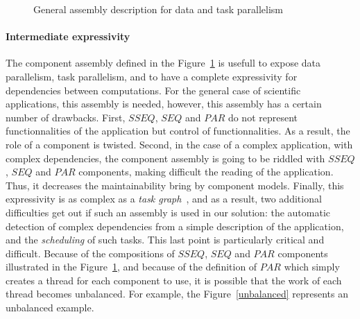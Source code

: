 \begin{figure}[h!]
\begin{center}
\caption{General assembly description for data and task parallelism}
\label{allparall}
\end{center}
\end{figure}

\paragraph{Intermediate expressivity}
The component assembly defined in the Figure~\ref{allparall} is usefull to expose data parallelism, task parallelism, and to have a complete expressivity for dependencies between computations. For the general case of scientific applications, this assembly is needed, however, this assembly has a certain number of drawbacks. First, $SSEQ$, $SEQ$ and $PAR$ do not represent functionnalities of the application but control of functionnalities. As a result, the role of a component is twisted. Second, in the case of a complex application, with complex dependencies, the component assembly is going to be riddled with $SSEQ$, $SEQ$ and $PAR$ components, making difficult the reading of the application. Thus, it decreases the maintainability bring by component models. Finally, this expressivity is as complex as a \textit{task graph}~\cite{}, and as a result, two additional difficulties get out if such an assembly is used in our solution: the automatic detection of complex dependencies from a simple description of the application, and the \textit{scheduling} of such tasks. This last point is particularly critical and difficult. Because of the compositions of $SSEQ$, $SEQ$ and $PAR$ components illustrated in the Figure~\ref{allparall}, and because of the definition of $PAR$ which simply creates a thread for each component to use, it is possible that the work of each thread becomes unbalanced. For example, the Figure~\ref{unbalanced} represents an unbalanced example. 

